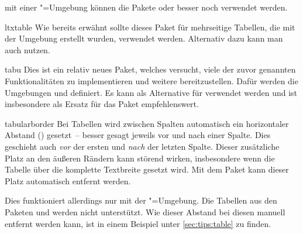 \begin{packages}
  mit einer "=Umgebung können die Pakete 
   oder besser noch  verwendet werden.
\item[ltxtable]
  Wie bereits erwähnt sollte dieses Paket für mehrseitige Tabellen, die mit der 
  Umgebung  erstellt wurden, verwendet werden. 
  Alternativ dazu kann man auch  nutzen.
\item[tabu]
  Dies ist ein relativ neues Paket, welches versucht, viele der zuvor genannten 
  Funktionalitäten zu implementieren und weitere bereitzustellen. Dafür werden 
  die Umgebungen  und  definiert. Es 
  kann als Alternative für  verwendet werden und ist 
  insbesondere als Ersatz für das Paket  empfehlenswert.
\item[tabularborder]
  Bei Tabellen wird zwischen Spalten automatisch ein horizontaler Abstand 
  () gesetzt~-- besser gesagt jeweils vor und nach einer 
  Spalte. Dies geschieht auch \emph{vor} der ersten und \emph{nach} der letzten 
  Spalte. Dieser zusätzliche Platz an den äußeren Rändern kann störend wirken, 
  insbesondere wenn die Tabelle über die komplette Textbreite gesetzt wird. Mit 
  dem Paket  kann dieser Platz automatisch entfernt 
  werden.
  
  Dies funktioniert allerdings nur mit der "=Umgebung. 
  Die Tabellen aus den Paketen  und  werden 
  nicht unterstützt. Wie dieser Abstand bei diesen manuell entfernt werden 
  kann, ist in einem Beispiel unter \autoref{sec:tips:table} zu finden.
\end{packages}


